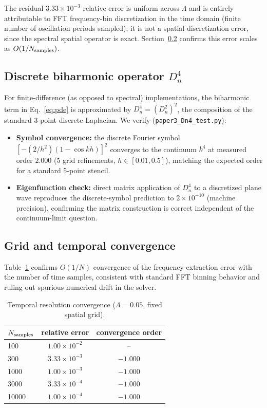 \documentclass[12pt,a4paper]{article}
\begin{document}
The residual $3.33\times10^{-3}$ relative error is uniform across
$\Lambda$ and is entirely attributable to FFT frequency-bin discretization
in the time domain (finite number of oscillation periods sampled); it is
not a spatial discretization error, since the spectral spatial operator
is exact. Section~\ref{sec:convergence} confirms this error scales as
$O(1/N_{\rm samples})$.

\subsection{Discrete biharmonic operator $D_n^4$}

For finite-difference (as opposed to spectral) implementations, the
biharmonic term in Eq.~\eqref{eq:pde} is approximated by
$D_n^4=(D_n^2)^2$, the composition of the standard 3-point discrete
Laplacian. We verify (\texttt{paper3\_Dn4\_test.py}):

\begin{itemize}
  \item[\checkmark] \textbf{Symbol convergence:} the discrete Fourier
    symbol $[-(2/h^2)(1-\cos kh)]^2$ converges to the continuum $k^4$ at
    measured order $2.000$ (5 grid refinements, $h\in[0.01,0.5]$),
    matching the expected order for a standard 5-point stencil.
  \item[\checkmark] \textbf{Eigenfunction check:} direct matrix
    application of $D_n^4$ to a discretized plane wave reproduces the
    discrete-symbol prediction to $2\times10^{-10}$ (machine precision),
    confirming the matrix construction is correct independent of the
    continuum-limit question.
\end{itemize}

\subsection{Grid and temporal convergence}
\label{sec:convergence}

Table~\ref{tab:convergence} confirms $O(1/N)$ convergence of the
frequency-extraction error with the number of time samples, consistent
with standard FFT binning behavior and ruling out spurious numerical
drift in the solver.

\begin{table}[h]
\centering
\caption{Temporal resolution convergence ($\Lambda=0.05$, fixed spatial
grid).}
\label{tab:convergence}
\begin{tabular}{lcc}
\toprule
$N_{\rm samples}$ & relative error & convergence order \\
\midrule
100    & $1.00\times10^{-2}$ & --    \\
300    & $3.33\times10^{-3}$ & $-1.000$ \\
1000   & $1.00\times10^{-3}$ & $-1.000$ \\
3000   & $3.33\times10^{-4}$ & $-1.000$ \\
10000  & $1.00\times10^{-4}$ & $-1.000$ \\
\bottomrule
\end{tabular}
\end{table}
\end{document}
